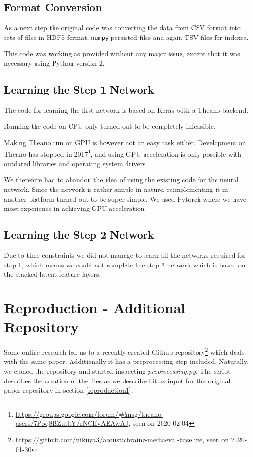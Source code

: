 \documentclass[sigconf,nonacm]{acmart}
\begin{document}
\subsection{Format Conversion}

As a next step the original code was converting the data from
CSV format into sets of files in HDF5 format, \texttt{numpy}
persisted files and again TSV files for indexes.

This code was working as provided without any major issue,
except that it was necessary using Python version 2.

\subsection{Learning the Step 1 Network}

The code for learning the first network is based on Keras
with a Theano backend.

Running the code on CPU only turned out to be completely infeasible.

Making Theano run on GPU is however not an easy task either.
Development on Theano has stopped in 
2017\footnote{\url{https://groups.google.com/forum/#!msg/theano-users/7Poq8BZutbY/rNCIfvAEAwAJ}, seen on 2020-02-04},
and using GPU acceleration
is only possible with outdated libraries and operating system drivers.

We therefore had to abandon the idea of using the existing code
for the neural network.
Since the network is rather simple in nature, reimplementing
it in another platform turned out to be super simple.
We used Pytorch where we have most experience
in achieving GPU acceleration.

\subsection{Learning the Step 2 Network}

Due to time constraints we did not manage to learn all
the networks required for step 1, which means we could not
complete the step 2 network which is based on the
stacked latent feature layers.

\section{Reproduction - Additional Repository}\label{reproduction2}

Some online research led us to a recently created Github repository\footnote{\url{https://github.com/nikuya3/acousticbrainz-mediaeval-baseline}, seen on 2020-01-30} which deals with the same paper. Additionally it has a preprocessing step included. Naturally, we cloned the repository and started inspecting \textit{preprocessing.py}. The script describes the creation of the files as we described it as input for the original paper repository in  section \ref{reproduction1}.
\end{document}
